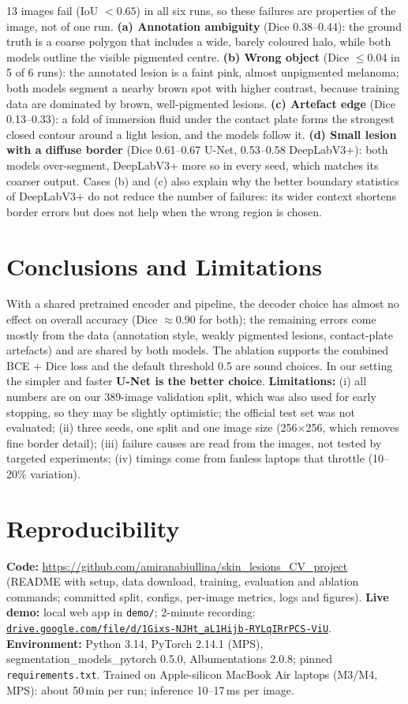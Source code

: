 \documentclass[11pt,a4paper]{article}
\begin{document}
13 images fail (IoU $<0.65$) in all six runs, so these failures are properties of the image, not of one run.
\textbf{(a) Annotation ambiguity} (Dice 0.38--0.44): the ground truth is a coarse polygon that includes a wide,
barely coloured halo, while both models outline the visible pigmented centre.
\textbf{(b) Wrong object} (Dice $\leq$0.04 in 5 of 6 runs): the annotated lesion is a faint pink, almost unpigmented
melanoma; both models segment a nearby brown spot with higher contrast, because training data are dominated by
brown, well-pigmented lesions.
\textbf{(c) Artefact edge} (Dice 0.13--0.33): a fold of immersion fluid under the contact plate forms the strongest
closed contour around a light lesion, and the models follow it.
\textbf{(d) Small lesion with a diffuse border} (Dice 0.61--0.67 U-Net, 0.53--0.58 DeepLabV3+): both models
over-segment, DeepLabV3+ more so in every seed, which matches its coarser output. Cases (b) and (c) also explain why the better boundary statistics of DeepLabV3+ do not reduce the number
of failures: its wider context shortens border errors but does not help when the wrong region is chosen.

\section{Conclusions and Limitations}

With a shared pretrained encoder and pipeline, the decoder choice has almost no effect on overall accuracy
(Dice $\approx$0.90 for both); the remaining errors come mostly from the data (annotation style, weakly pigmented
lesions, contact-plate artefacts) and are shared by both models. The ablation supports the combined
BCE + Dice loss and the default threshold 0.5 are sound choices. In our setting the simpler and faster
\textbf{U-Net is the better choice}. \textbf{Limitations:} (i) all numbers are on our 389-image validation split,
which was also used for early stopping, so they may be slightly optimistic; the official test set was not evaluated;
(ii) three seeds, one split and one image size (256$\times$256, which removes fine border detail);
(iii) failure causes are read from the images, not tested by targeted experiments; (iv) timings come from fanless
laptops that throttle (10--20\% variation).

\section{Reproducibility}

\textbf{Code:} \url{https://github.com/amiranabiullina/skin_lesions_CV_project} (README with setup, data download, training, evaluation and ablation commands; committed split, configs,
per-image metrics, logs and figures).
\textbf{Live demo:} local web app in \texttt{demo/}; 2-minute recording: \href{https://drive.google.com/file/d/1Gixs-NJHt_aL1Hijb-RYLqIRrPCS-ViU/view?usp=sharing}{\nolinkurl{drive.google.com/file/d/1Gixs-NJHt_aL1Hijb-RYLqIRrPCS-ViU}}.
\textbf{Environment:} Python 3.14, PyTorch 2.14.1 (MPS), segmentation\_models\_pytorch 0.5.0, Albumentations 2.0.8;
pinned \texttt{requirements.txt}. Trained on Apple-silicon MacBook Air laptops (M3/M4, MPS): about 50\,min per run; inference 10--17\,ms per image.
\end{document}
